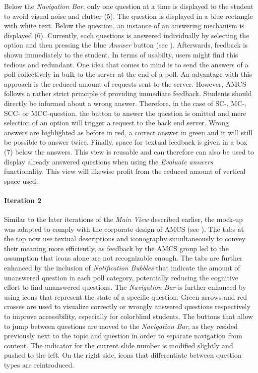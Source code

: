 \newline
\newline
Below the \emph{Navigation Bar}, only one question at a time is displayed to the student to avoid visual noise and clutter (5). The question is displayed in a blue rectangle with white text. Below the question, an instance of an answering mechanism is displayed (6). 
Currently, each questions is answered individually by selecting the option and then pressing the blue \emph{Answer} button (see ). Afterwards, feedback is shown immediately to the student. In terms of usabilty, users might find this tedious and redundant. One idea that comes to mind is to send the answers of a poll collectively in bulk to the server at the end of a poll. An advantage with this approach is the reduced amount of requests sent to the server. However, AMCS follows a rather strict principle of providing immediate feedback. Students should directly be informed about a wrong answer.
Therefore, in the case of SC-, MC-, SCC- or MCC-question, the button to answer the question is omitted and mere selection of an option will trigger a request to the back end server.
Wrong answers are highlighted as before in red, a correct answer in green and it will still be possible to answer twice. Finally, space for textual feedback is given in a box (7) below the answers. This view is reusable and can therefore can also be used to display already answered questions when using the \emph{Evaluate answers} functionality. This view will likewise profit from the reduced amount of vertical space used. 

\paragraph{Iteration 2}
Similar to the later iterations of the \emph{Main View} described earlier, the mock-up was adapted to comply with the corporate design of AMCS (see ).
The tabs at the top now use textual descriptions and iconography simultaneously to convey their meaning more efficiently, as feedback by the AMCS group led to the assumption that icons alone are not recognizable enough. The tabs are further enhanced by the inclusion of \emph{Notification Bubbles} that indicate the amount of unanswered question in each poll category, potentially reducing the cognitive effort to find unanswered questions.
The \emph{Navigation Bar} is further enhanced by using icons that represent the state of a specific question. Green arrows and red crosses are used to visualize correctly or wrongly answered questions respectively to improve accessibility, especially for colorblind students.
The buttons that allow to jump between questions are moved to the \emph{Navigation Bar}, as they resided previously next to the topic and question in order to separate navigation from content.
The indicator for the current slide number is modified slightly and pushed to the left. On the right side, icons that differentiate between question types are reintroduced. 
